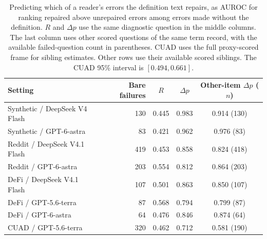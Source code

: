 \begin{table}[t]\centering\footnotesize
\caption{Predicting which of a reader's errors the definition text repairs, as AUROC for ranking repaired above unrepaired errors among errors made without the definition. $R$ and $\Delta p$ use the same diagnostic question in the middle columns. The last column uses other scored questions of the same term record, with the available failed-question count in parentheses. CUAD uses the full proxy-scored frame for sibling estimates. Other rows use their available scored siblings. The CUAD 95\% interval is $[0.494,0.661]$.}
\label{tab:conditional-repair}
\begin{tabular}{@{}p{4.4cm}rccc@{}}\toprule
Setting & Bare failures & $R$ & $\Delta p$ & Other-item $\Delta p$ ($n$)\\\midrule
Synthetic / DeepSeek V4 Flash & 130 & 0.445 & 0.983 & 0.914 (130)\\
Synthetic / GPT-6-astra & 83 & 0.421 & 0.962 & 0.976 (83)\\
Reddit / DeepSeek V4.1 Flash & 419 & 0.453 & 0.858 & 0.824 (418)\\
Reddit / GPT-6-astra & 203 & 0.554 & 0.812 & 0.864 (203)\\
DeFi / DeepSeek V4.1 Flash & 107 & 0.501 & 0.863 & 0.850 (107)\\
DeFi / GPT-5.6-terra & 87 & 0.568 & 0.794 & 0.799 (87)\\
DeFi / GPT-6-astra & 64 & 0.476 & 0.846 & 0.874 (64)\\
CUAD / GPT-5.6-terra & 320 & 0.462 & 0.712 & 0.581 (190)\\
\bottomrule\end{tabular}\end{table}
